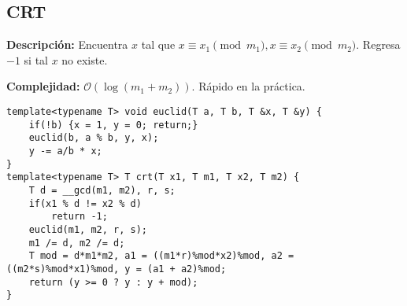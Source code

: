 \documentclass[twocolumn]{article}
\begin{document}
\subsection{CRT}
\begin{footnotesize}{\bf Descripción: } Encuentra $x$ tal que $x \equiv x_1 \pmod{m_1}, x \equiv x_2 \pmod{m_2}$. Regresa $-1$ si tal $x$ no existe.


{\bf Complejidad: } $\mathcal{O}(\log(m_1 + m_2))$. Rápido en la práctica.
\end{footnotesize}\lstset{basicstyle=\footnotesize\ttfamily,breaklines=true,tabsize=2,language=C++,frame=leftline, numbers=left, numberstyle=\tiny, numbersep=5pt}
\begin{lstlisting}
template<typename T> void euclid(T a, T b, T &x, T &y) {
	if(!b) {x = 1, y = 0; return;}
	euclid(b, a % b, y, x);
	y -= a/b * x;
}
template<typename T> T crt(T x1, T m1, T x2, T m2) {
	T d = __gcd(m1, m2), r, s;
	if(x1 % d != x2 % d)
		return -1;
	euclid(m1, m2, r, s);
	m1 /= d, m2 /= d;
	T mod = d*m1*m2, a1 = ((m1*r)%mod*x2)%mod, a2 = ((m2*s)%mod*x1)%mod, y = (a1 + a2)%mod;
	return (y >= 0 ? y : y + mod);
}
\end{lstlisting}
\end{document}
